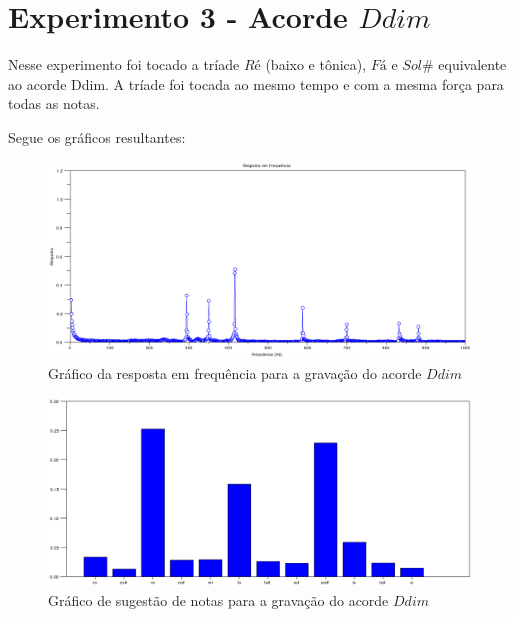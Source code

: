 \section{Experimento 3 - Acorde $Ddim$}
\label{sec:experimento3}

Nesse experimento foi tocado a tríade $Ré$ (baixo e tônica), $Fá$ e $Sol\#$ equivalente ao acorde Ddim. A tríade foi tocada ao mesmo tempo e com a mesma força para todas as notas.

Segue os gráficos resultantes:

\begin{figure}[h]
	\centering
		\includegraphics[keepaspectratio=true,scale=0.49]{figuras/Dm/fft_Ddim.eps}
	\caption{Gráfico da resposta em frequência para a gravação do acorde $Ddim$}
\end{figure}

\begin{figure}[h]
	\centering
		\includegraphics[keepaspectratio=true,scale=0.49]{figuras/Dm/notas_Ddim.eps}
	\caption{Gráfico de sugestão de notas para a gravação do acorde $Ddim$}
\end{figure}

